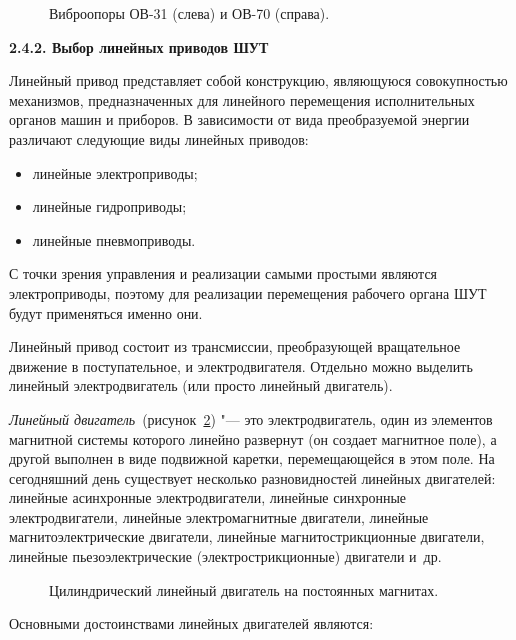 \begin{figure}[ht]
	\caption{Виброопоры ОВ-31 (слева) и ОВ-70 (справа).}\label{fig:vibro}
\end{figure}

\textbf{2.4.2. Выбор линейных приводов ШУТ}

Линейный привод представляет собой конструкцию, являющуюся совокупностью механизмов, предназначенных для линейного перемещения исполнительных органов машин и приборов. В зависимости от вида преобразуемой энергии различают следующие виды линейных приводов:

\begin{itemize}
	\item линейные электроприводы;
	
	\item линейные гидроприводы;
	
	\item линейные пневмоприводы.
\end{itemize}

С точки зрения управления и реализации самыми простыми являются электроприводы, поэтому для реализации перемещения рабочего органа ШУТ будут применяться именно они.

Линейный привод состоит из трансмиссии, преобразующей вращательное движение в поступательное, и электродвигателя. Отдельно можно выделить линейный электродвигатель (или просто линейный двигатель).

\textit{Линейный двигатель}~(рисунок~\cref{fig:lindrive}) "--- это электродвигатель, один из элементов магнитной системы которого линейно развернут (он создает магнитное поле), а другой выполнен в виде подвижной каретки, перемещающейся в этом поле. На сегодняшний день существует несколько разновидностей линейных двигателей: линейные асинхронные электродвигатели, линейные синхронные электродвигатели, линейные электромагнитные двигатели, линейные магнитоэлектрические двигатели, линейные магнитострикционные двигатели, линейные пьезоэлектрические (электрострикционные) двигатели и~др.

\begin{figure}[ht]
	\caption{Цилиндрический линейный двигатель на постоянных магнитах.}\label{fig:lindrive}
\end{figure}

Основными достоинствами линейных двигателей являются:

